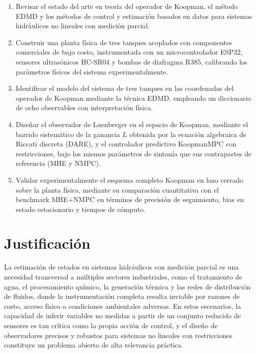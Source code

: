 \documentclass[12pt,letterpaper]{article}
\begin{document}
\begin{enumerate}
    \item Revisar el estado del arte en teoría del operador de Koopman, el método
    EDMD y los métodos de control y estimación basados en datos para sistemas
    hidráulicos no lineales con medición parcial.

    \item Construir una planta física de tres tanques acoplados con componentes
    comerciales de bajo costo, instrumentada con un microcontrolador ESP32,
    sensores ultrasónicos HC-SR04 y bombas de diafragma R385, calibrando los
    parámetros físicos del sistema experimentalmente.

    \item Identificar el modelo del sistema de tres tanques en las coordenadas del
    operador de Koopman mediante la técnica EDMD, empleando un diccionario de ocho
    observables con interpretación física.

    \item Diseñar el observador de Luenberger en el espacio de Koopman, mediante
    el barrido sistemático de la ganancia $L$ obtenida por la ecuación algebraica
    de Riccati discreta (DARE), y el controlador predictivo KoopmanMPC con
    restricciones, bajo los mismos parámetros de sintonía que sus contrapartes de
    referencia (MHE y NMPC).

    \item Validar experimentalmente el esquema completo Koopman en lazo cerrado
    sobre la planta física, mediante su comparación cuantitativa con el benchmark
    MHE+NMPC en términos de precisión de seguimiento, bias en estado estacionario y
    tiempos de cómputo.
\end{enumerate}

\section{Justificación}
\label{sec:justificacion}

La estimación de estados en sistemas hidráulicos con medición parcial es una
necesidad transversal a múltiples sectores industriales, como el tratamiento de
agua, el procesamiento químico, la generación térmica y las redes de distribución
de fluidos, donde la instrumentación completa resulta inviable por razones de costo, acceso
físico o condiciones ambientales adversas. En estos escenarios, la capacidad de
inferir variables no medidas a partir de un conjunto reducido de sensores es tan
crítica como la propia acción de control, y el diseño de observadores precisos y
robustos para sistemas no lineales con restricciones constituye un problema abierto
de alta relevancia práctica.
\end{document}

